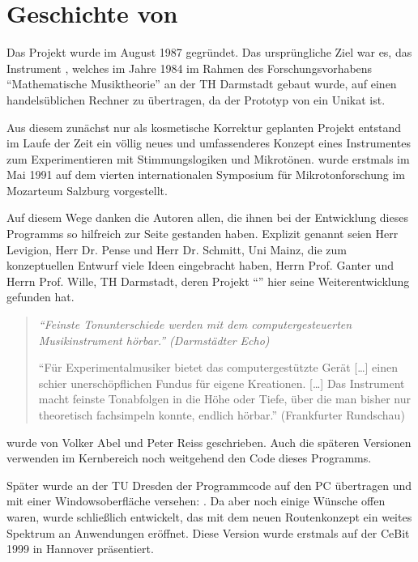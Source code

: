 \section{Geschichte von \texorpdfstring{\mutabor}{Mutabor}}

Das Projekt \mutabor[~II] wurde im August 1987 gegründet. Das
ursprüngliche Ziel war es, das Instrument \mutabor{}, welches im Jahre
1984 im Rahmen des Forschungsvorhabens "`Mathematische Musiktheorie"'
an der TH Darmstadt gebaut wurde, auf einen handelsüblichen Rechner zu
übertragen, da der Prototyp von \mutabor{} ein Unikat ist.

Aus diesem zunächst nur als kosmetische Korrektur geplanten 
Projekt entstand im Laufe der Zeit ein völlig neues und umfassenderes 
Konzept eines Instrumentes zum Experimentieren mit Stimmungslogiken 
und Mikrotönen. \mutabor[~II] wurde erstmals im Mai 1991 
auf dem vierten internationalen Symposium für Mikrotonforschung 
im Mozarteum Salzburg vorgestellt.

Auf diesem Wege danken die Autoren allen, die ihnen bei der
Entwicklung dieses Programms so hilfreich zur Seite gestanden haben.
Explizit genannt seien Herr Levigion, Herr Dr. Pense und Herr Dr.
Schmitt, Uni Mainz, die zum konzeptuellen Entwurf viele Ideen
eingebracht haben, Herrn Prof. Ganter und Herrn Prof. Wille, TH
Darmstadt, deren Projekt "`\mutabor{}"' hier seine Weiterentwicklung
gefunden hat.

\begin{quotation}\itshape
"`Feinste Tonunterschiede werden mit dem computergesteuerten 
Musikinstrument \mutabor[~II] hörbar."' (Darmstädter Echo)

"`Für Experimentalmusiker bietet das computergestützte 
Gerät [\dots{}] einen schier unerschöpflichen Fundus für eigene 
Kreationen. [\dots{}] Das Instrument macht feinste Tonabfolgen in 
die Höhe oder Tiefe, über die man bisher nur theoretisch 
fachsimpeln konnte, endlich hörbar."' (Frankfurter Rundschau)
\end{quotation}


\mutabor[~II] wurde von Volker Abel und Peter Reiss geschrieben.  Auch
die späteren Versionen verwenden im Kernbereich noch weitgehend den
Code dieses Programms.

Später wurde an der TU Dresden der Programmcode auf den PC 
übertragen und mit einer Windowsoberfläche versehen: \mutabor[~II.win]. 
Da aber noch einige Wünsche offen waren, wurde schließlich \mutabor[~3] 
entwickelt, das mit dem neuen Routenkonzept ein weites Spektrum 
an Anwendungen eröffnet. Diese Version wurde erstmals auf der 
CeBit 1999 in Hannover präsentiert.

